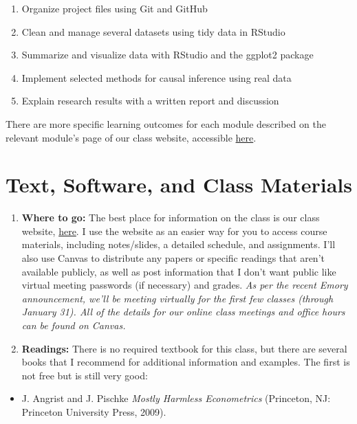 \documentclass[11pt,]{article}
\providecommand{\tightlist}{%
  \setlength{\itemsep}{0pt}\setlength{\parskip}{0pt}}
\begin{document}
\begin{enumerate}
\def\labelenumi{\arabic{enumi}.}
\tightlist
\item
  Organize project files using Git and GitHub
\item
  Clean and manage several datasets using tidy data in RStudio
\item
  Summarize and visualize data with RStudio and the ggplot2 package
\item
  Implement selected methods for causal inference using real data
\item
  Explain research results with a written report and discussion
\end{enumerate}

There are more specific learning outcomes for each module described on
the relevant module's page of our class website, accessible
\href{https://econ470s22.classes.ianmccarthyecon.com/}{here}.

\hypertarget{text-software-and-class-materials}{%
\section{Text, Software, and Class
Materials}\label{text-software-and-class-materials}}

\begin{enumerate}
\def\labelenumi{\arabic{enumi}.}
\item
  \textbf{Where to go:} The best place for information on the class is
  our class website,
  \href{https://econ470s22.classes.ianmccarthyecon.com/}{here}. I use
  the website as an easier way for you to access course materials,
  including notes/slides, a detailed schedule, and assignments. I'll
  also use Canvas to distribute any papers or specific readings that
  aren't available publicly, as well as post information that I don't
  want public like virtual meeting passwords (if necessary) and grades.
  \emph{As per the recent Emory announcement, we'll be meeting virtually
  for the first few classes (through January 31). All of the details for
  our online class meetings and office hours can be found on Canvas.}
\item
  \textbf{Readings:} There is no required textbook for this class, but
  there are several books that I recommend for additional information
  and examples. The first is not free but is still very good:
\end{enumerate}

\begin{itemize}
\tightlist
\item
  J. Angrist and J. Pischke \emph{Mostly Harmless Econometrics}
  (Princeton, NJ: Princeton University Press, 2009).
\end{itemize}
\end{document}
